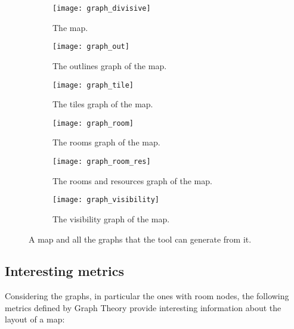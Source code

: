 \begin{figure}[]
	\centering
	\hfill
  	\begin{subfigure}[t]{0.45\linewidth}
		\texttt{[image: graph\_divisive]}
     		\caption{The map.}
     		\label{img:graph_divisive}
 	\end{subfigure}
 	\hfill
  	\begin{subfigure}[t]{0.45\linewidth}
    		\texttt{[image: graph\_out]}
    		\caption{The outlines graph of the map.}
     		\label{img:graph_out}
  	\end{subfigure}
  	\hfill
  	
  	\hfill
  	\begin{subfigure}[t]{0.45\linewidth}
    		\texttt{[image: graph\_tile]}
    		\caption{The tiles graph of the map.}
     		\label{img:graph_tile}
  	\end{subfigure}
  	\hfill
  	\begin{subfigure}[t]{0.45\linewidth}
    		\texttt{[image: graph\_room]}
    		\caption{The rooms graph of the map.}
     		\label{img:graph_room}
 	\end{subfigure}
 	\hfill
 	
 	\hfill
  	\begin{subfigure}[t]{0.45\linewidth}
    		\texttt{[image: graph\_room\_res]}
    		\caption{The rooms and resources graph of the map.}
     		\label{img:graph_room_res}
  	\end{subfigure}
  	\hfill
  	\begin{subfigure}[t]{0.45\linewidth}
    		\texttt{[image: graph\_visibility]}
    		\caption{The visibility graph of the map.}
     		\label{img:graph_visibility}
  	\end{subfigure}	
  	\hfill
	\caption{A map and all the graphs that the tool can generate from it.}
\end{figure}

\subsection{Interesting metrics}

Considering the graphs, in particular the ones with room nodes, the following metrics defined by Graph Theory provide interesting information about the layout of a map:

